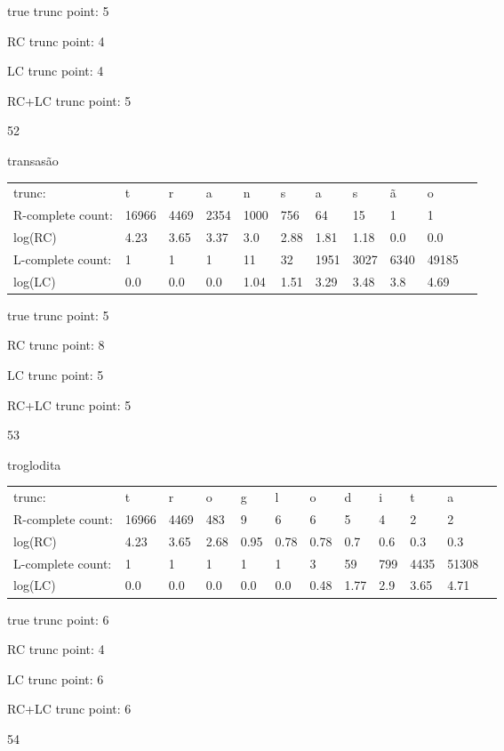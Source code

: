\documentclass{article}
\begin{document}
true trunc point: 5

RC trunc point: 4

LC trunc point: 4

RC+LC trunc point: 5

\vspace{1em}

52

transasão

\begin{tabular}{l|llllllllll}
trunc: & t & r & a & n & s & a & s & ã & o & \\ 
R-complete count: & 16966 & 4469 & 2354 & 1000 & 756 & 64 & 15 & 1 & 1 & \\ 
log(RC) & 4.23 & 3.65 & 3.37 & 3.0 & 2.88 & 1.81 & 1.18 & 0.0 & 0.0 & \\ 
L-complete count: & 1 & 1 & 1 & 11 & 32 & 1951 & 3027 & 6340 & 49185 & \\ 
log(LC) & 0.0 & 0.0 & 0.0 & 1.04 & 1.51 & 3.29 & 3.48 & 3.8 & 4.69 & \\ 
\end{tabular}

true trunc point: 5

RC trunc point: 8

LC trunc point: 5

RC+LC trunc point: 5

\newpage

53

troglodita

\begin{tabular}{l|lllllllllll}
trunc: & t & r & o & g & l & o & d & i & t & a & \\ 
R-complete count: & 16966 & 4469 & 483 & 9 & 6 & 6 & 5 & 4 & 2 & 2 & \\ 
log(RC) & 4.23 & 3.65 & 2.68 & 0.95 & 0.78 & 0.78 & 0.7 & 0.6 & 0.3 & 0.3 & \\ 
L-complete count: & 1 & 1 & 1 & 1 & 1 & 3 & 59 & 799 & 4435 & 51308 & \\ 
log(LC) & 0.0 & 0.0 & 0.0 & 0.0 & 0.0 & 0.48 & 1.77 & 2.9 & 3.65 & 4.71 & \\ 
\end{tabular}

true trunc point: 6

RC trunc point: 4

LC trunc point: 6

RC+LC trunc point: 6

\vspace{1em}

54
\end{document}
